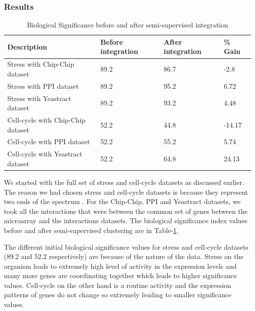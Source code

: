 \subsubsection{Results}
\begin{table}
\centering
\begin{tabular}{|l|l|l|l|}
\hline
Description & Before integration & After integration & \% Gain\\
\hline
Stress with Chip-Chip dataset & 89.2 & 86.7 & -2.8\\
Stress with PPI dataset & 89.2 & 95.2 & 6.72\\
Stress with Yeastract dataset & 89.2 & 93.2 & 4.48\\
\hline
Cell-cycle with Chip-Chip dataset & 52.2 & 44.8 & -14.17\\
Cell-cycle with PPI dataset & 52.2 & 55.2 & 5.74\\
Cell-cycle with Yeastract dataset & 52.2 & 64.8 & 24.13\\
\hline 
\end{tabular}
\caption{Biological Significance before and after semi-supervised integration}
\label{tab:biol_significance}
\end{table}

We started with the full set of stress and cell-cycle datasets as discussed earlier. The reason we had chosen stress and cell-cycle datasets is because they represent two ends of the spectrum \citep{amos05integrative}. 
For the Chip-Chip, PPI and Yeastract datasets, we took all the interactions that were between the common set of genes between the microarray and the interactions datasets. 
The biological significance index values before and after semi-supervised clustering are in Table-\ref{tab:biol_significance}. 

The different initial biological significance values for stress and cell-cycle datasets (89.2 and 52.2 respectively) are because of the nature of the data. Stress on the organism leads to extremely high level of activity 
in the expression levels and many more genes are coordinating together which leads to higher significance values. Cell-cycle on the other hand is a routine activity and the 
expression patterns of genes do not change so extremely leading to smaller significance values.

